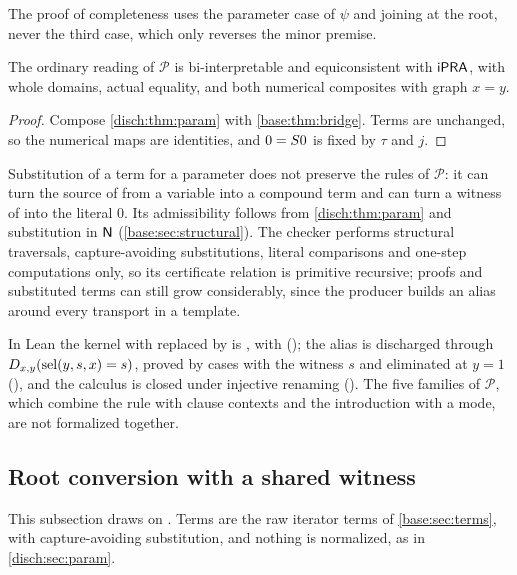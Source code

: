 The proof of completeness uses the parameter case of $\psi$ and joining at
the root, never the third case, which only reverses the minor premise.

\begin{corollary}
\label{disch:cor:param-ipra}
The ordinary reading of $\mathcal P$ is bi-interpretable and
equiconsistent with $\mathsf{iPRA}$, with whole domains, actual equality, and both
numerical composites with graph $x=y$.
\end{corollary}

\begin{proof}
Compose \cref{disch:thm:param} with \cref{base:thm:bridge}. Terms are
unchanged, so the numerical maps are identities, and $0=S 0$ is fixed
by $\tau$ and $j$.
\end{proof}

\begin{remark}
\label{disch:rem:param}
Substitution of a term for a parameter does not preserve the rules of
$\mathcal P$: it can turn the source of  from a variable
into a compound term and can turn a witness of  into the
literal $0$. Its admissibility follows from \cref{disch:thm:param} and
substitution in $\mathsf{N}$ (\cref{base:sec:structural}). The checker performs
structural traversals, capture-avoiding substitutions, literal comparisons
and one-step computations only, so its certificate relation is primitive
recursive; proofs and substituted terms can still grow considerably, since
the producer builds an alias around every transport in a template.

In Lean the kernel with  replaced by  is
, with  (); the
alias is discharged through $D_{x,y}(\operatorname{sel}(y,s,x)=s)$, proved by cases with
the witness $s$ and eliminated at $y=1$ (), and the
calculus is closed under injective renaming (). The five
families of $\mathcal P$, which combine the rule with clause contexts and
the introduction with a mode, are not formalized together.
\end{remark}

\subsection{Root conversion with a shared witness}
\label{disch:sec:bundle}

This subsection draws on . Terms are the raw
iterator terms of \cref{base:sec:terms}, with capture-avoiding substitution,
and nothing is normalized, as in \cref{disch:sec:param}.

